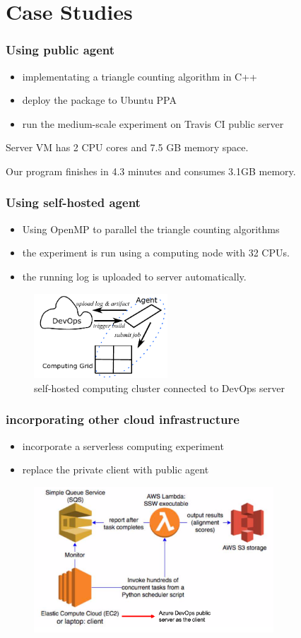 \documentclass[notheorems]{beamer}
\begin{document}
\section{Case Studies}
\begin{frame}
\frametitle{Using public agent}
\begin{itemize}
\item implementating a triangle counting algorithm in C++
\item deploy the package to Ubuntu PPA
\item run the medium-scale experiment on Travis CI public server
\end{itemize}
Server VM has 2 CPU cores and 7.5 GB memory space.

Our program finishes in 4.3 minutes and consumes 3.1GB memory.
\end{frame}
\begin{frame}
\frametitle{Using self-hosted agent}
\begin{itemize}
\item Using OpenMP to parallel the triangle counting algorithms
\item the experiment is run using a computing node with 32 CPUs.
\item the running log is uploaded to server automatically.
\end{itemize}
\begin{figure}
\includegraphics[width=5cm]{../self-hosted.pdf}
\caption{self-hosted computing cluster connected to DevOps server}
\end{figure}
\end{frame}

\begin{frame}
\frametitle{incorporating other cloud infrastructure}
\begin{itemize}
\item incorporate a serverless computing experiment
\item replace the private client with public agent
\end{itemize}
\begin{figure}
\includegraphics[width=0.8\textwidth]{pic/serverless_show.png}
\end{figure}
\end{frame}
\end{document}
